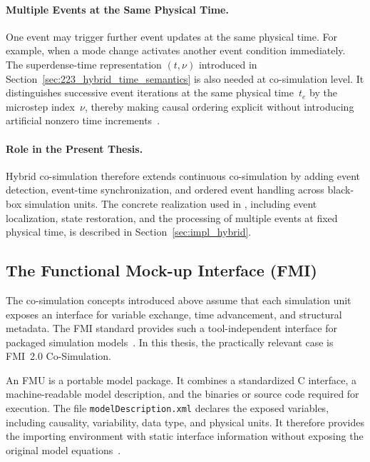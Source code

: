 \paragraph{Multiple Events at the Same Physical Time.}
One event may trigger further event updates at the same physical time.
For example, when a mode change activates another event condition immediately.
The superdense-time representation $(t,\nu)$ introduced in Section~\ref{sec:223_hybrid_time_semantics} is also needed at co-simulation level.
It distinguishes successive event iterations at the same physical time~$t_e$ by the microstep index~$\nu$, thereby making causal ordering explicit without introducing artificial nonzero time increments~\cite{broman_determinate_2013,cremona_hybrid_2019}.

\paragraph{Role in the Present Thesis.}
Hybrid co-simulation therefore extends continuous co-simulation by adding event detection, event-time synchronization, and ordered event handling across black-box simulation units.
The concrete realization used in \syssimx{}, including event localization, state restoration, and the processing of multiple events at fixed physical time, is described in Section~\ref{sec:impl_hybrid}.

\subsection{The Functional Mock-up Interface (FMI)}
\label{sec:237_cosim_fmi}

The co-simulation concepts introduced above assume that each simulation unit exposes an interface for variable exchange, time advancement, and structural metadata.
The \ac{FMI} standard provides such a tool-independent interface for packaged simulation models~\cite{modelica_association_project_fmi_functional_2014}.
In this thesis, the practically relevant case is \ac{FMI}~2.0 Co-Simulation.

An \ac{FMU} is a portable model package.
It combines a standardized C interface, a machine-readable model description, and the binaries or source code required for execution.
The file \texttt{modelDescription.xml} declares the exposed variables, including causality, variability, data type, and physical units.
It therefore provides the importing environment with static interface information without exposing the original model equations~\cite{modelica_association_project_fmi_functional_2014}.

